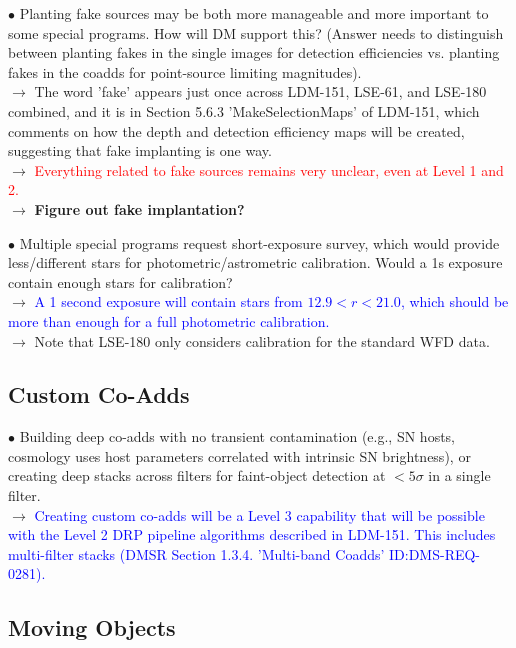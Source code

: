 \documentclass[DM,lsstdraft,toc]{lsstdoc}
\begin{document}
$\bullet$ Planting fake sources may be both more manageable and more important to some special programs. How will DM support this? (Answer needs to distinguish between planting fakes in the single images for detection efficiencies vs. planting fakes in the coadds for point-source limiting magnitudes). \\
$\rightarrow$ The word 'fake' appears just once across LDM-151, LSE-61, and LSE-180 combined, and it is in Section 5.6.3 'MakeSelectionMaps' of LDM-151, which comments on how the depth and detection efficiency maps will be created, suggesting that fake implanting is one way. \\
$\rightarrow$ \textcolor{red}{Everything related to fake sources remains very unclear, even at Level 1 and 2.} \\
$\rightarrow$ \textbf{Figure out fake implantation?}

$\bullet$ Multiple special programs request short-exposure survey, which would provide less/different stars for photometric/astrometric calibration. Would a 1s exposure contain enough stars for calibration? \\
$\rightarrow$ \textcolor{blue}{A 1 second exposure will contain stars from $12.9<r<21.0$, which should be more than enough for a full photometric calibration.} \\
$\rightarrow$ Note that LSE-180 only considers calibration for the standard WFD data.

\subsection{Custom Co-Adds}\label{ssec:issues_coadds}

$\bullet$ Building deep co-adds with no transient contamination (e.g., SN hosts, cosmology uses host parameters correlated with intrinsic SN brightness), or creating deep stacks across filters for faint-object detection at $<5\sigma$ in a single filter. \\
$\rightarrow$ \textcolor{blue}{Creating custom co-adds will be a Level 3 capability that will be possible with the Level 2 DRP pipeline algorithms described in LDM-151. This includes multi-filter stacks (DMSR Section 1.3.4. 'Multi-band Coadds' ID:DMS-REQ-0281).}


\subsection{Moving Objects}\label{ssec:issues_mops}
\end{document}
